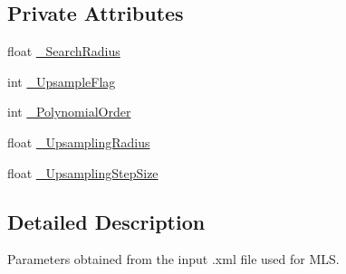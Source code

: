 \subsection*{Private Attributes}
\begin{DoxyCompactItemize}
\item 
float \hyperlink{classMovingLeastSquaresParameters_ace6402da7b8c13b1e9580feab78e610b}{\-\_\-\-Search\-Radius}
\item 
int \hyperlink{classMovingLeastSquaresParameters_a10483be15c8dcf7a055db0e756da79c6}{\-\_\-\-Upsample\-Flag}
\item 
int \hyperlink{classMovingLeastSquaresParameters_acdeef23f673452952dcbc92d64857092}{\-\_\-\-Polynomial\-Order}
\item 
float \hyperlink{classMovingLeastSquaresParameters_a66226cf257b54f18f755496e69e26836}{\-\_\-\-Upsampling\-Radius}
\item 
float \hyperlink{classMovingLeastSquaresParameters_af232552a6c8d62b1db80067d9c3deb2c}{\-\_\-\-Upsampling\-Step\-Size}
\end{DoxyCompactItemize}


\subsection{Detailed Description}
Parameters obtained from the input .xml file used for M\-L\-S. 

